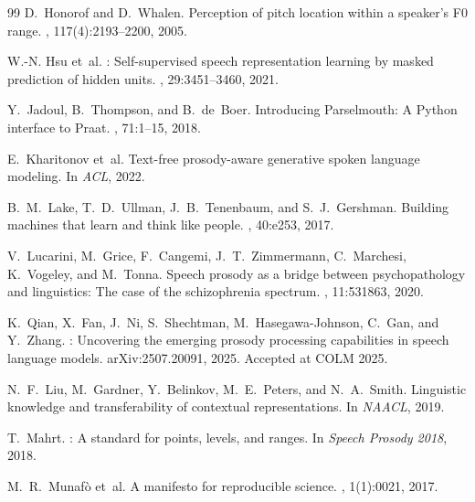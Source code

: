 \documentclass[11pt,letterpaper]{article}
\begin{document}
\begin{thebibliography}{99}
D.~Honorof and D.~Whalen.
\newblock Perception of pitch location within a speaker's {F0} range.
, 117(4):2193--2200, 2005.

W.-N. Hsu et~al.
: Self-supervised speech representation learning by masked prediction of hidden units.
, 29:3451--3460, 2021.

Y.~Jadoul, B.~Thompson, and B.~de~Boer.
\newblock Introducing {Parselmouth}: A {Python} interface to {Praat}.
, 71:1--15, 2018.

E.~Kharitonov et~al.
\newblock Text-free prosody-aware generative spoken language modeling.
\newblock In {\em ACL}, 2022.

B.~M.\ Lake, T.~D.\ Ullman, J.~B.\ Tenenbaum, and S.~J.\ Gershman.
\newblock Building machines that learn and think like people.
, 40:e253, 2017.

V.~Lucarini, M.~Grice, F.~Cangemi, J.~T.\ Zimmermann, C.~Marchesi, K.~Vogeley, and M.~Tonna.
\newblock Speech prosody as a bridge between psychopathology and linguistics: The case of the schizophrenia spectrum.
, 11:531863, 2020.

K.~Qian, X.~Fan, J.~Ni, S.~Shechtman, M.~Hasegawa-Johnson, C.~Gan, and Y.~Zhang.
: Uncovering the emerging prosody processing capabilities in speech language models.
\newblock arXiv:2507.20091, 2025. Accepted at COLM 2025.

N.~F.\ Liu, M.~Gardner, Y.~Belinkov, M.~E.\ Peters, and N.~A.\ Smith.
\newblock Linguistic knowledge and transferability of contextual representations.
\newblock In {\em NAACL}, 2019.

T.~Mahrt.
: A standard for points, levels, and ranges.
\newblock In {\em Speech Prosody 2018}, 2018.

M.~R.\ Munaf{\`o} et~al.
\newblock A manifesto for reproducible science.
, 1(1):0021, 2017.


\end{thebibliography}
\end{document}
